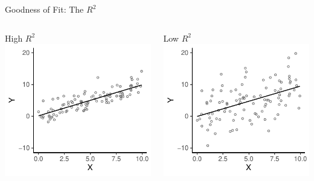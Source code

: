\documentclass{./../div_teaching_slides}
\begin{document}
\begin{frame}{Goodness of Fit: The $R^2$}
\begin{columns}
\begin{column}{0.5\textwidth}
\centering
High $R^2$ \\
	\includegraphics{./../../output/rsquared_high}
\end{column}
\begin{column}{0.5\textwidth}
\centering
Low $R^2$ \\
	\includegraphics{./../../output/rsquared_low}
\end{column}
\end{columns}

\end{frame}
\end{document}
